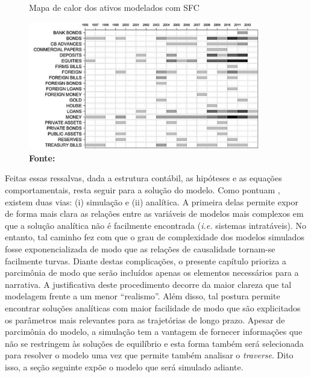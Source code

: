 \begin{figure}[H]
	\centering
	\caption{Mapa de calor dos ativos modelados com SFC}
	\label{Heatmap}
	\includegraphics[width = 0.9\textwidth]{Modelo/Caverzassi_Heatmap.png}
	\caption*{\textbf{Fonte:} \textcite[p.~4]{caverzasi_stock-flow_2013}}
\end{figure}






Feitas essas ressalvas, dada a estrutura contábil, as hipóteses e as equações comportamentais, resta seguir para a solução do modelo. Como pontuam \textcite{caverzasi_stock-flow_2013}, existem duas vias: (i) simulação e (ii) analítica. A primeira delas permite expor de forma mais clara as relações entre as variáveis de modelos mais complexos em que a solução analítica não é facilmente encontrada (\textit{i.e.} sistemas intratáveis). No entanto, tal caminho fez com que o grau de complexidade dos modelos simulados fosse exponencializada de modo que as relações de causalidade tornam-se facilmente turvas. Diante destas complicações, o presente capítulo prioriza a parcimônia de modo que serão incluídos apenas os elementos necessários para a narrativa. A justificativa deste procedimento decorre da maior clareza que tal modelagem frente a um menor ``realismo''.
Além disso, tal postura permite encontrar soluções analíticas com maior facilidade de modo que são explicitados os parâmetros mais relevantes para as trajetórias de longo prazo. Apesar de parcimônia do modelo, a simulação tem a vantagem
de fornecer informações que não se restringem às soluções de equilíbrio e esta forma
também será selecionada para resolver o modelo uma vez que permite também analisar o \textit{traverse}.
Dito isso, a seção seguinte expõe o modelo que será simulado adiante.
